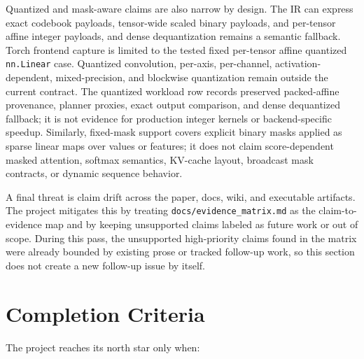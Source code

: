 \documentclass[11pt]{article}
\begin{document}
Quantized and mask-aware claims are also narrow by design. The IR can express
exact codebook payloads, tensor-wide scaled binary payloads, and per-tensor
affine integer payloads, and dense dequantization remains a semantic fallback.
Torch frontend capture is limited to the tested fixed per-tensor affine
quantized \texttt{nn.Linear} case. Quantized convolution, per-axis,
per-channel, activation-dependent, mixed-precision, and blockwise quantization
remain outside the current contract. The quantized workload row records
preserved packed-affine provenance, planner proxies, exact output comparison,
and dense dequantized fallback; it is not evidence for production integer
kernels or backend-specific speedup. Similarly, fixed-mask support covers explicit
binary masks applied as sparse linear maps over values or features; it does
not claim score-dependent masked attention, softmax semantics, KV-cache
layout, broadcast mask contracts, or dynamic sequence behavior.

A final threat is claim drift across the paper, docs, wiki, and executable
artifacts. The project mitigates this by treating
\texttt{docs/evidence\_matrix.md} as the claim-to-evidence map and by keeping
unsupported claims labeled as future work or out of scope. During this pass,
the unsupported high-priority claims found in the matrix were already bounded
by existing prose or tracked follow-up work, so this section does not create a
new follow-up issue by itself.

\section{Completion Criteria}

The project reaches its north star only when:
\end{document}
